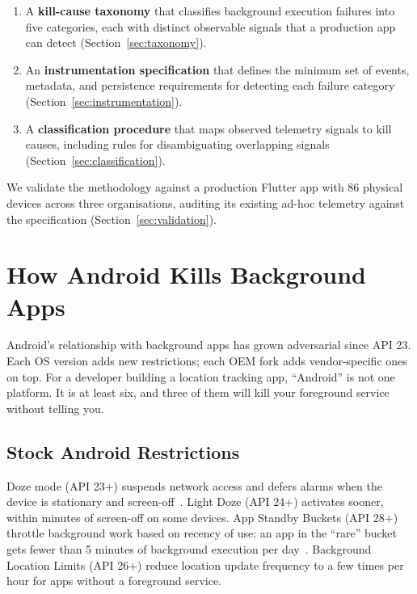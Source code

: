 \documentclass[10pt,journal,compsoc]{IEEEtran}
\begin{document}
\begin{enumerate}
  \item A \textbf{kill-cause taxonomy} that classifies background
        execution failures into five categories, each with distinct
        observable signals that a production app can detect
        (Section~\ref{sec:taxonomy}).
  \item An \textbf{instrumentation specification} that defines the
        minimum set of events, metadata, and persistence requirements
        for detecting each failure category
        (Section~\ref{sec:instrumentation}).
  \item A \textbf{classification procedure} that maps observed telemetry
        signals to kill causes, including rules for disambiguating
        overlapping signals (Section~\ref{sec:classification}).
\end{enumerate}

We validate the methodology against a production Flutter app with 86
physical devices across three organisations, auditing its existing ad-hoc
telemetry against the specification (Section~\ref{sec:validation}).


\section{How Android Kills Background Apps}
\label{sec:landscape}

Android's relationship with background apps has grown adversarial since
API 23. Each OS version adds new restrictions; each OEM fork adds
vendor-specific ones on top. For a developer building a location tracking
app, ``Android'' is not one platform. It is at least six, and three of
them will kill your foreground service without telling you.

\subsection{Stock Android Restrictions}

Doze mode (API 23+) suspends network access and defers alarms when the
device is stationary and screen-off~\cite{android_doze}. Light Doze
(API 24+) activates sooner, within minutes of screen-off on some
devices. App Standby Buckets (API 28+) throttle background work based on
recency of use: an app in the ``rare'' bucket gets fewer than 5 minutes
of background execution per day~\cite{android_buckets}. Background
Location Limits (API 26+) reduce location update frequency to a few
times per hour for apps without a foreground service.
\end{document}

